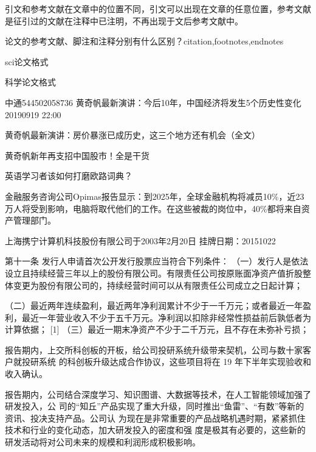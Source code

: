 \documentclass[letterpaper,12pt,english]{sphinxmanual}
\begin{document}
引文和参考文献在文章中的位置不同，引文可以出现在文章的任意位置，参考文献是征引过的文献在注释中已注明，不再出现于文后参考文献中。

论文的参考文献、脚注和注释分别有什么区别？citation,footnotes,endnotes

sci论文格式

科学论文格式

中通544502058736
黄奇帆最新演讲：今后10年，中国经济将发生5个历史性变化2019\sphinxhyphen{}09\sphinxhyphen{}19 22:00

黄奇帆最新演讲：房价暴涨已成历史，这三个地方还有机会（全文）

黄奇帆新年再支招中国股市！全是干货

英语学习者该如何打磨欧路词典？

金融服务咨询公司Opimas报告显示：到2025年，全球金融机构将减员10\%，近23万人将受到影响，电脑将取代他们的工作。在这些被裁的岗位中，40\%都将来自资产管理部门。

上海携宁计算机科技股份有限公司于2003年2月20日
挂牌日期：2015\sphinxhyphen{}10\sphinxhyphen{}22

第十一条 发行人申请首次公开发行股票应当符合下列条件：
（一）发行人是依法设立且持续经营三年以上的股份有限公司。有限责任公司按原账面净资产值折股整体变更为股份有限公司的，持续经营时间可以从有限责任公司成立之日起计算；

（二）最近两年连续盈利，最近两年净利润累计不少于一千万元；或者最近一年盈利，最近一年营业收入不少于五千万元。净利润以扣除非经常性损益前后孰低者为计算依据； {[}1{]}
（三）最近一期末净资产不少于二千万元，且不存在未弥补亏损；

报告期内，上交所科创板的开板，给公司投研系统升级带来契机，公司与数十家客户就投研系统 的科创板升级达成合作协议，这些项目将在 19 年下半年实现验收和收入确认。

报告期内，公司结合深度学习、知识图谱、大数据等技术，在人工智能领域加强了研发投入，公 司的“知丘”产品实现了重大升级，同时推出“鱼雷”、“有数”等新的资讯、投决支持产品。公司认 为现在是非常重要的产品战略机遇时期，紧紧抓住技术和行业的变化动态，加大研发投入的密度和强
度是极其有必要的，这些新的研发活动将对公司未来的规模和利润形成积极影响。
\end{document}
